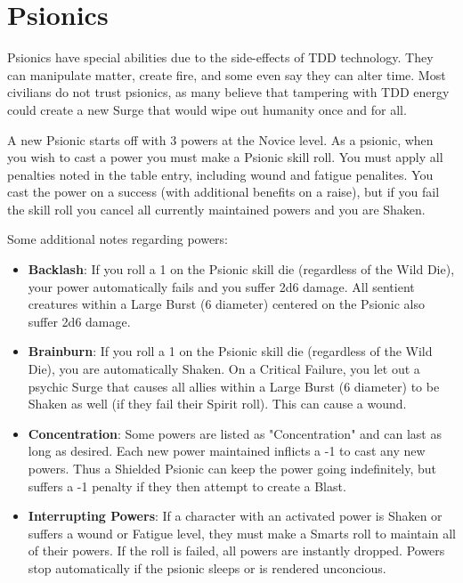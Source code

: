 
\section{Psionics}
\label{sec:psionics}

\begin{multicols}{2}

Psionics have special abilities due to the side-effects of TDD technology. They can manipulate matter, create fire, and some even say they can alter time. Most civilians do not trust psionics, as many believe that tampering with TDD energy could create a new Surge that would wipe out humanity once and for all.

A new Psionic starts off with 3 powers at the Novice level. As a psionic, when you wish to cast a power you must make a Psionic skill roll. You must apply all penalties noted in the table entry, including wound and fatigue penalites. You cast the power on a success (with additional benefits on a raise), but if you fail the skill roll you cancel all currently maintained powers and you are Shaken.

Some additional notes regarding powers:

\begin{itemize}

  \item \textbf{Backlash}: If you roll a 1 on the Psionic skill die (regardless of the Wild Die), your power automatically fails and you suffer 2d6 damage. All sentient creatures within a Large Burst (6 diameter) centered on the Psionic also suffer 2d6 damage.

  \item \textbf{Brainburn}: If you roll a 1 on the Psionic skill die (regardless of the Wild Die), you are automatically Shaken. On a Critical Failure, you let out a psychic Surge that causes all allies within a Large Burst (6 diameter) to be Shaken as well (if they fail their Spirit roll). This can cause a wound.

  \item \textbf{Concentration}: Some powers are listed as "Concentration" and can last as long as desired. Each new power maintained inflicts a -1 to cast any new powers. Thus a Shielded Psionic can keep the power going indefinitely, but suffers a -1 penalty if they then attempt to create a Blast.

  \item \textbf{Interrupting Powers}: If a character with an activated power is Shaken or suffers a wound or Fatigue level, they must make a Smarts roll to maintain all of their powers. If the roll is failed, all powers are instantly dropped. Powers stop automatically if the psionic sleeps or is rendered unconcious.


\end{itemize}
\end{multicols}
